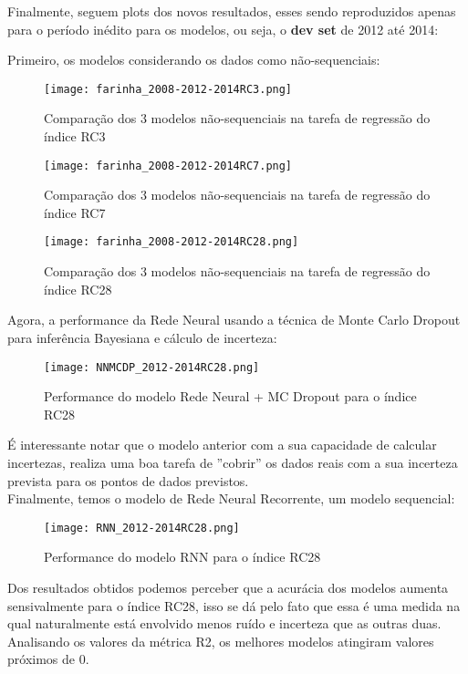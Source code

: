 Finalmente, seguem plots dos novos resultados, esses sendo reproduzidos apenas para o período inédito para os modelos, ou seja, o \textbf{dev set} de 2012 até 2014:


\bigskip
Primeiro, os modelos considerando os dados como não-sequenciais:

\begin{figure}[H]
\centering
\texttt{[image: farinha\_2008-2012-2014RC3.png]}
\caption{Comparação dos 3 modelos não-sequenciais na tarefa de regressão do índice RC3}
\end{figure}

\begin{figure}[H]
\centering
\texttt{[image: farinha\_2008-2012-2014RC7.png]}
\caption{Comparação dos 3 modelos não-sequenciais na tarefa de regressão do índice RC7}
\end{figure}

\begin{figure}[H]
\centering
\texttt{[image: farinha\_2008-2012-2014RC28.png]}
\caption{Comparação dos 3 modelos não-sequenciais na tarefa de regressão do índice RC28}
\end{figure}


Agora, a performance da Rede Neural usando a técnica de Monte Carlo Dropout para inferência Bayesiana e cálculo de incerteza:


\begin{figure}[H]
\centering
\texttt{[image: NNMCDP\_2012-2014RC28.png]}
\caption{Performance do modelo Rede Neural + MC Dropout para o índice RC28}
\end{figure}


É interessante notar que o modelo anterior com a sua capacidade de calcular incertezas, realiza uma boa tarefa de  ''cobrir'' os dados reais com a sua incerteza prevista para os pontos de dados previstos. \\ 

Finalmente, temos o modelo de Rede Neural Recorrente, um modelo sequencial:


\begin{figure}[H]
\centering
\texttt{[image: RNN\_2012-2014RC28.png]}
\caption{Performance do modelo RNN para o índice RC28}
\end{figure}


\bigskip

Dos resultados obtidos podemos perceber que a acurácia dos modelos aumenta sensivalmente para o índice RC28, isso se dá pelo fato que essa é uma medida na qual naturalmente está envolvido menos ruído e incerteza que as outras duas. Analisando os valores da métrica R2, os melhores modelos atingiram valores próximos de $0$.


